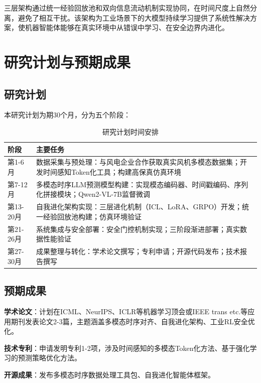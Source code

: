 \documentclass[12pt,a4paper]{article}
\begin{document}
三层架构通过统一经验回放池和双向信息流动机制实现协同，在时间尺度上自然分离，避免了相互干扰。该架构为工业场景下的大模型持续学习提供了系统性解决方案，使机器智能体能够在真实环境中从错误中学习、在安全边界内进化。
\section{研究计划与预期成果}

\subsection{研究计划}

本研究计划为期30个月，分为五个阶段：

\begin{table}[h]
\centering
\caption{研究计划时间安排}
\label{tab:schedule}
\begin{tabular}{p{2.5cm}p{10cm}}
\hline
\textbf{阶段} & \textbf{主要任务} \\
\hline
第1-6月 & 数据采集与预处理：与风电企业合作获取真实风机多模态数据集；开发时间感知Token化工具；构建高保真仿真环境 \\
第7-12月 & 多模态时序LLM预测模型构建：实现模态编码器、时间戳编码、序列化拼接模块；Qwen2-VL-7B监督微调 \\
第13-20月 & 自我进化架构实现：三层进化机制（ICL、LoRA、GRPO）开发；统一经验回放池构建；仿真环境验证 \\
第21-26月 & 系统集成与安全部署：安全门控机制实现；三阶段渐进部署；真实数据性能验证 \\
第27-30月 & 成果整理与转化：学术论文撰写；专利申请；开源代码发布；技术报告撰写 \\
\hline
\end{tabular}
\end{table}

\subsection{预期成果}

\textbf{学术论文}：计划在ICML、NeurIPS、ICLR等机器学习顶会或IEEE trans etc.等应用期刊发表论文2-3篇，主题涵盖多模态时序对齐、自我进化架构、工业RL安全优化。

\textbf{技术专利}：申请发明专利1-2项，涉及时间感知的多模态Token化方法、基于强化学习的预测策略优化方法。

\textbf{开源成果}：发布多模态时序数据处理工具包、自我进化智能体框架。
\end{document}
